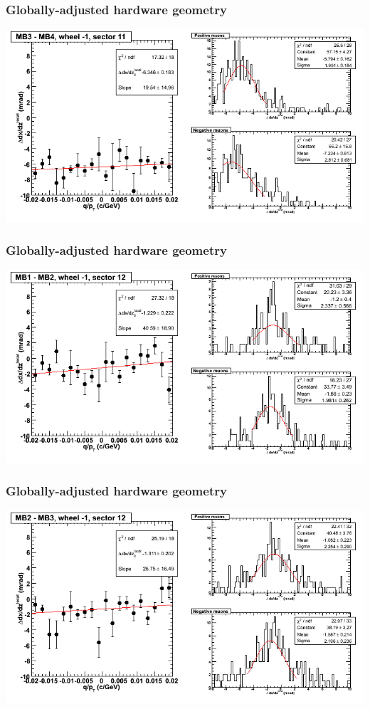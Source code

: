 \documentclass[compress]{beamer}
\begin{document}
\begin{frame}
\frametitle{Globally-adjusted hardware geometry}
\includegraphics[width=\linewidth]{NOV4_segdiffs_HW/dt13_slope_B_11_34.png}
\end{frame}

\begin{frame}
\frametitle{Globally-adjusted hardware geometry}
\includegraphics[width=\linewidth]{NOV4_segdiffs_HW/dt13_slope_B_12_12.png}
\end{frame}

\begin{frame}
\frametitle{Globally-adjusted hardware geometry}
\includegraphics[width=\linewidth]{NOV4_segdiffs_HW/dt13_slope_B_12_23.png}
\end{frame}
\end{document}
